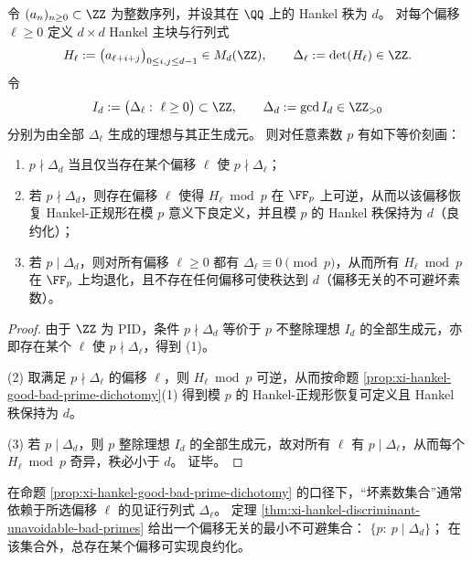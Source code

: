 \begin{theorem}\label{thm:xi-hankel-discriminant-unavoidable-bad-primes}
令 \((a_n)_{n\ge 0}\subset\ZZ\) 为整数序列，并设其在 \(\QQ\) 上的 Hankel 秩为 \(d\)。
对每个偏移 \(\ell\ge 0\) 定义 \(d\times d\) Hankel 主块与行列式
\[
H_\ell:=\bigl(a_{\ell+i+j}\bigr)_{0\le i,j\le d-1}\in M_d(\ZZ),
\qquad
\Delta_\ell:=\det(H_\ell)\in\ZZ.
\]
令
\[
I_d:=\bigl(\Delta_\ell:\ \ell\ge 0\bigr)\subset\ZZ,
\qquad
\Delta_d:=\gcd I_d\in\ZZ_{>0}
\]
分别为由全部 \(\Delta_\ell\) 生成的理想与其正生成元。
则对任意素数 \(p\) 有如下等价刻画：
\begin{enumerate}
  \item \(p\nmid \Delta_d\) 当且仅当存在某个偏移 \(\ell\) 使 \(p\nmid \Delta_\ell\)；
  \item 若 \(p\nmid \Delta_d\)，则存在偏移 \(\ell\) 使得 \(H_\ell\bmod p\) 在 \(\FF_p\) 上可逆，从而以该偏移恢复 Hankel-正规形在模 \(p\) 意义下良定义，并且模 \(p\) 的 Hankel 秩保持为 \(d\)（良约化）；
  \item 若 \(p\mid \Delta_d\)，则对所有偏移 \(\ell\ge 0\) 都有 \(\Delta_\ell\equiv 0\pmod p\)，从而所有 \(H_\ell\bmod p\) 在 \(\FF_p\) 上均退化，且不存在任何偏移可使秩达到 \(d\)（偏移无关的不可避坏素数）。
\end{enumerate}
\end{theorem}
\begin{proof}
由于 \(\ZZ\) 为 PID，条件 \(p\nmid\Delta_d\) 等价于 \(p\) 不整除理想 \(I_d\) 的全部生成元，亦即存在某个 \(\ell\) 使 \(p\nmid\Delta_\ell\)，得到 (1)。
\par
(2) 取满足 \(p\nmid \Delta_\ell\) 的偏移 \(\ell\)，则 \(H_\ell\bmod p\) 可逆，从而按命题 \ref{prop:xi-hankel-good-bad-prime-dichotomy}(1) 得到模 \(p\) 的 Hankel-正规形恢复可定义且 Hankel 秩保持为 \(d\)。
\par
(3) 若 \(p\mid\Delta_d\)，则 \(p\) 整除理想 \(I_d\) 的全部生成元，故对所有 \(\ell\) 有 \(p\mid\Delta_\ell\)，从而每个 \(H_\ell\bmod p\) 奇异，秩必小于 \(d\)。
证毕。
\end{proof}

\begin{remark}[最小素数支撑的偏移不变性]\label{rem:xi-hankel-discriminant-minimal-unavoidable-prime-support}
在命题 \ref{prop:xi-hankel-good-bad-prime-dichotomy} 的口径下，“坏素数集合”通常依赖于所选偏移 \(\ell\) 的见证行列式 \(\Delta_\ell\)。
定理 \ref{thm:xi-hankel-discriminant-unavoidable-bad-primes} 给出一个偏移无关的最小不可避集合：
\(
\{p:\ p\mid \Delta_d\}
\)；
在该集合外，总存在某个偏移可实现良约化。
\end{remark}

